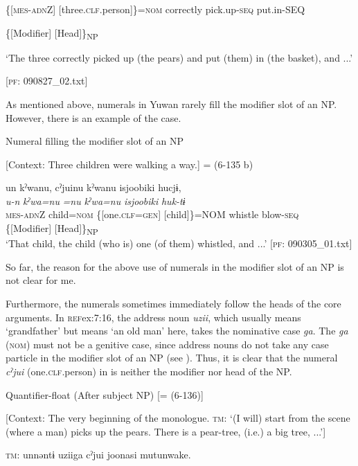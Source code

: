       \{[\textsc{mes}-\textsc{adn}Z]  [three.\textsc{clf}.person]\}=\textsc{nom}  correctly  pick.up-\textsc{seq}            put.in-SEQ

      \{[Modifier]  [Head]\}\textsubscript{NP}    

      ‘The three correctly picked up (the pears) and put (them) in (the basket), and ...’

      [\textsc{pf}: 090827\_02.txt]
    \z
\z

As mentioned above, numerals in Yuwan rarely fill the modifier slot of an NP. However, there is an example of the case.

\ea \label{ex:7:15}  Numeral filling the modifier slot of an NP

  [Context: Three children were walking a way.] = (6-135 b)

\gllll  un  kˀwanu,  cˀjuinu  kˀwanu  isjoobiki   hucjɨ,\\
\textit{u-n}  \textit{kˀwa=nu}  \textit{=nu}  \textit{kˀwa=nu}  \textit{isjoobiki} \textit{huk-tɨ}\\
\textsc{mes}-\textsc{adn}Z  child=\textsc{nom}  \{[one.\textsc{clf}=\textsc{gen}]  [child]\}=NOM  whistle   blow-\textsc{seq}\\
\{[Modifier]  [Head]\}\textsubscript{NP}      \\
\glt ‘That child, the child (who is) one (of them) whistled, and ...’ [\textsc{pf}: 090305\_01.txt]
\z

So far, the reason for the above use of numerals in the modifier slot of an NP is not clear for me.

Furthermore, the numerals sometimes immediately follow the heads of the core arguments. In \textsc{ref}{ex:7:16}, the address noun \textit{uzii}, which usually means ‘grandfather’ but means ‘an old man’ here, takes the nominative case \textit{ga}. The \textit{ga} (\textsc{nom}) must not be a genitive case, since address nouns do not take any case particle in the modifier slot of an NP (see ). Thus, it is clear that the numeral \textit{cˀjui} (one.\textsc{clf}.person) in  is neither the modifier nor head of the NP.

\ea \label{ex:7:16}  Quantifier-float (After subject NP) [= (6-136)]

  [Context: The very beginning of the monologue. \textsc{tm}: ‘(I will) start from the scene (where a man) picks up the pears. There is a pear-tree, (i.e.) a big tree, ...’]

  \textsc{tm}:  unnəntɨ  uziiga  cˀjui  joonasi   mutunwake.

